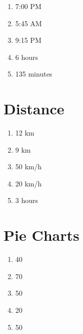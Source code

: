 \documentclass[10pt,a4paper]{article}
\begin{document}
\begin{enumerate}
\item 7:00 PM
\item 5:45 AM
\item 9:15 PM
\item 6 hours
\item 135 minutes
\end{enumerate}

\section *{Distance}

\begin{enumerate}
\item 12 km
\item 9 km
\item 50 km/h
\item 20 km/h
\item 3 hours
\end{enumerate}

\section *{Pie Charts}

\begin{enumerate}
\item 40%
\item 70%
\item 50%
\item 20%
\item 50%
\end{enumerate}
\end{document}
